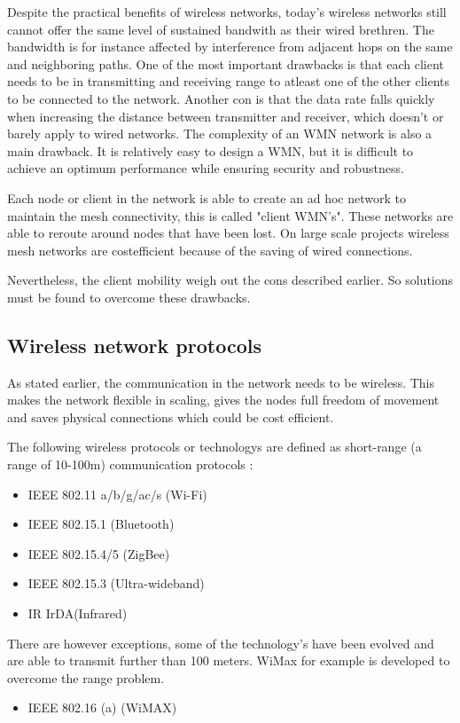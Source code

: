 \documentclass[10pt,a4paper]{article}
\begin{document}
Despite the practical benefits of wireless networks, today's wireless networks still cannot offer the same level of sustained bandwith as their wired brethren. The bandwidth is for instance affected by interference from adjacent hops on the same and neighboring paths. \cite{architectureandalgorithmsmultichannelwirelessmeshnetwork} One of the most important drawbacks is that each client needs to be in transmitting and receiving range to atleast one of the other clients to be connected to the network. \cite{wirelessmeshnetworksopportunitiesandchallenges} Another con is that the data rate falls quickly when increasing the distance between transmitter and receiver, which doesn't or barely apply to wired networks. \cite{architectureandalgorithmsmultichannelwirelessmeshnetwork} The complexity of an WMN network is also a main drawback. It is relatively easy to design a WMN, but it is difficult to achieve an optimum performance while ensuring security and robustness.\cite{wirelessmeshnetworksopportunitiesandchallenges} 

Each node or client in the network is able to create an ad hoc network to maintain the mesh connectivity, this is called "client WMN's". These networks are able to reroute around nodes that have been lost. On large scale projects wireless mesh networks are costefficient because of the saving of wired connections.\cite{meshnetworking} 

Nevertheless, the client mobility weigh out the cons described earlier. So solutions must be found to overcome these drawbacks.

\newpage
\subsection{Wireless network protocols}
As stated earlier, the communication in the network needs to be wireless. This makes the network flexible in scaling, gives the nodes full freedom of movement and saves physical connections which could be cost efficient.

The following wireless protocols or technologys are defined as short-range (a range of 10-100m) communication protocols \cite{emergingstandarsforwirelessmeshtechnology} \cite{combook}:
\begin{itemize}
\setlength\itemsep{0em}
    \item IEEE 802.11 a/b/g/ac/s (Wi-Fi) \cite{IEEE80211timeline}
    \item IEEE 802.15.1 (Bluetooth)
    \item IEEE 802.15.4/5 (ZigBee)
    \item IEEE 802.15.3 (Ultra-wideband)
    \item IR IrDA(Infrared)
\end{itemize}
 There are however exceptions, some of the technology's have been evolved and are able to transmit further than 100 meters. WiMax for example is developed to overcome the range problem. 
\begin{itemize}
\setlength\itemsep{0em}
     \item IEEE 802.16 (a) (WiMAX)
\end{itemize}
\end{document}
